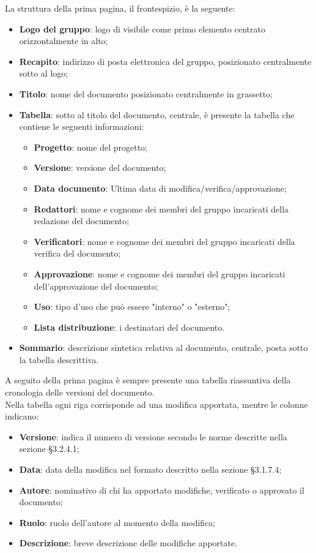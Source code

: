 		La struttura della prima pagina, il frontespizio, è la seguente:
		\begin{itemize}
			\item \textbf{Logo del gruppo}: logo di \Omicron visibile come primo elemento centrato orizzontalmente in alto;
			\item \textbf{Recapito}: indirizzo di posta elettronica del gruppo, posizionato centralmente sotto al logo;
			\item \textbf{Titolo}: nome del documento posizionato centralmente in grassetto;
			\item \textbf{Tabella}: sotto al titolo del documento, centrale, è presente la tabella che contiene le seguenti informazioni:
			\begin{itemize}
				\item \textbf{Progetto}: nome del progetto;
				\item \textbf{Versione}: versione del documento;
				\item \textbf{Data documento}: Ultima data di modifica/verifica/approvazione;
				\item \textbf{Redattori}: nome e cognome dei membri del gruppo incaricati della redazione del documento;
				\item \textbf{Verificatori}: nome e cognome dei membri del gruppo incaricati della verifica del documento;
				\item \textbf{Approvazione}: nome e cognome dei membri del gruppo incaricati dell'approvazione del documento;
				\item \textbf{Uso}: tipo d'uso che può essere "interno" o "esterno";
				\item \textbf{Lista distribuzione}: i destinatari del documento.
			\end{itemize}
			\item \textbf{Sommario}: descrizione sintetica relativa al documento, centrale, posta sotto la tabella descrittiva.
		\end{itemize}
		
	A seguito della prima pagina è sempre presente una tabella riassuntiva della cronologia delle versioni del documento. \\
	Nella tabella ogni riga corrisponde ad una modifica apportata, mentre le colonne indicano:
	\begin{itemize}
		\item \textbf{Versione}: indica il numero di versione secondo le norme descritte nella sezione §3.2.4.1;
		\item \textbf{Data}: data della modifica nel formato descritto nella sezione §3.1.7.4;
		\item \textbf{Autore}: nominativo di chi ha apportato modifiche, verificato o approvato il documento;
		\item \textbf{Ruolo}: ruolo dell'autore al momento della modifica;
		\item \textbf{Descrizione}: breve descrizione delle modifiche apportate.
	\end{itemize}
	
